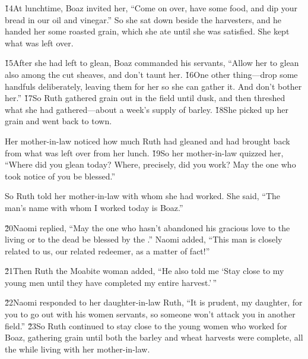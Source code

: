 \v{14}At lunchtime, Boaz invited her, ``Come on over, have some food, and dip your bread in our oil and vinegar.'' So she sat down beside the harvesters, and he handed her some roasted grain, which she ate until she was satisfied. She kept what was left over.

\v{15}After she had left to glean, Boaz commanded his servants, ``Allow her to glean also among the cut sheaves, and don't taunt her. \v{16}One other thing---drop some handfuls deliberately, leaving them for her so she can gather it. And don't bother her.'' \v{17}So Ruth gathered grain out in the field until dusk, and then threshed what she had gathered---about a week's supply of barley. \v{18}She picked up her grain and went back to town.

Her mother-in-law noticed how much Ruth had gleaned and had brought back from what was left over from her lunch. \v{19}So her mother-in-law quizzed her, ``Where did you glean today? Where, precisely, did you work? May the one who took notice of you be blessed.''

So Ruth told her mother-in-law with whom she had worked. She said, ``The man's name with whom I worked today is Boaz.''

\v{20}Naomi replied, ``May the one who hasn't abandoned his gracious love to the living or to the dead be blessed by the .'' Naomi added, ``This man is closely related to us, our related redeemer, as a matter of fact!''

\v{21}Then Ruth the Moabite woman added, ``He also told me `Stay close to my young men until they have completed my entire harvest.'\,''

\v{22}Naomi responded to her daughter-in-law Ruth, ``It is prudent, my daughter, for you to go out with his women servants, so someone won't attack you in another field.'' \v{23}So Ruth continued to stay close to the young women who worked for Boaz, gathering grain until both the barley and wheat harvests were complete, all the while living with her mother-in-law.

